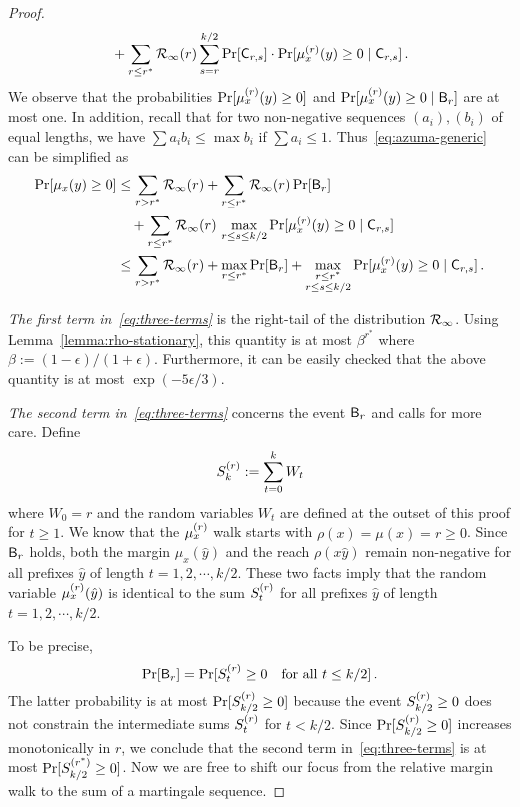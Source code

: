 \begin{proof}
\begin{align*}
    &\quad+ \sum_{r \leq r^*}{\mathcal{R}_\infty(r) \sum_{s = r}^{k/2}{\Pr[\mathsf{C}_{r,s}] \cdot \Pr[\mu_x^{(r)}(y) \geq 0 \mid \mathsf{C}_{r,s}]} }
    \, .
\end{align*} 
We observe that the probabilities $\Pr[\mu_x^{(r)}(y) \geq 0]$ and $\Pr[\mu_x^{(r)}(y) \geq 0 \mid \mathsf{B}_r]$ are at most one. 
In addition, recall that for two non-negative sequences $(a_i), (b_i)$ of equal lengths, 
we have $\sum{a_i b_i} \leq \max b_i$ if $\sum{a_i} \leq 1$. 
Thus~\eqref{eq:azuma-generic} can be simplified as
\begin{align}\label{eq:three-terms}
\Pr[\mu_x(y) \geq 0] 
 &\leq 
    \sum_{r > r^*}{\mathcal{R}_\infty(r)} 
  + \sum_{r \leq r^*}{\mathcal{R}_\infty(r) \Pr[\mathsf{B}_r]} \nonumber \\
  &\quad+ \sum_{r \leq r^*}{\mathcal{R}_\infty(r)\, \max_{r \leq s \leq k/2}{\Pr[\mu_x^{(r)}(y) \geq 0 \mid \mathsf{C}_{r,s}]} }
  \nonumber \\
 &\leq    
      \sum_{r > r^*}{\mathcal{R}_\infty(r)}            
  + 
      \max_{r \leq r^*}{\Pr[\mathsf{B}_r]}          
  + 
      \max_{\substack{r \leq r^* \\ r \leq s \leq k/2}}{\Pr[\mu_x^{(r)}(y) \geq 0 \mid \mathsf{C}_{r,s}]}   
\, .
\end{align}


\emph{The first term in~\eqref{eq:three-terms} } is the right-tail of the distribution $\mathcal{R}_\infty$. 
Using Lemma~\ref{lemma:rho-stationary}, 
this quantity is at most $\beta^{r^*}$ where $\beta := (1-\epsilon)/(1+\epsilon)$. 
Furthermore, it can be easily checked that the above quantity is at most $\exp(-5 \epsilon/3)$.

\emph{The second term in~\eqref{eq:three-terms} } concerns the event
$\mathsf{B}_r$ and calls for more care.  Define
\[
  S_k^{(r)} := \sum_{t=0}^k {W_t}
\]
where $W_0 = r$ and the random variables $W_t$ are defined at the
outset of this proof for $t \geq 1$.  We know that the $\mu_x^{(r)}$ walk
starts with $\rho(x) = \mu(x) = r \geq 0$.  Since $\mathsf{B}_r$ holds,
both the margin $\mu_x(\hat{y})$ and the reach $\rho(x\hat{y})$ remain
non-negative for all prefixes $\hat{y}$ of length
$t = 1, 2, \cdots, k/2$.  These two facts imply that the random
variable $\mu_x^{(r)}(\hat{y})$ is identical to the sum $S^{(r)}_t$ for all
prefixes $\hat{y}$ of length $t = 1, 2, \cdots, k/2$.

To be precise,
\[
  \Pr[\mathsf{B}_r] = \Pr[S^{(r)}_t \geq 0 \quad \text{for all } t \leq k/2]\,.
\]
The latter probability is at most $\Pr[S^{(r)}_{k/2} \geq 0]$ because the
event $S^{(r)}_{k/2} \geq 0$ does not constrain the intermediate sums
$S^{(r)}_t$ for $t < k/2$.  Since $\Pr[S^{(r)}_{k/2} \geq 0]$ increases
monotonically in $r$, we conclude that the second term
in~\eqref{eq:three-terms} is at most $\Pr[S^{(r^*)}_{k/2} \geq 0]$.  Now
we are free to shift our focus from the relative margin walk to the
sum of a martingale sequence.


\end{proof}
